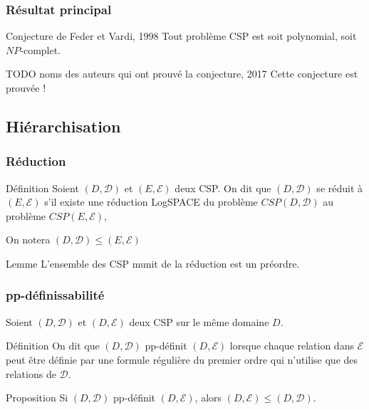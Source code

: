 \documentclass[12pt]{beamer}
\begin{document}
\begin{frame}
    \frametitle{Résultat principal}

    \begin{block}{Conjecture de Feder et Vardi, 1998}
        Tout problème CSP est soit polynomial, soit $NP$-complet.
    \end{block}
    \pause
    \begin{alertblock}{TODO noms des auteurs qui ont prouvé la conjecture, 2017}
        Cette conjecture est prouvée !
    \end{alertblock}
\end{frame}

\subsection{Hiérarchisation}

\begin{frame}
    \frametitle{Réduction}

    \begin{block}{Définition}
        Soient $(D,\mathcal{D})$ et $(E,\mathcal{E})$ deux CSP. On dit que
        $(D,\mathcal{D})$ se réduit à  $(E,\mathcal{E})$ s'il existe une réduction
        LogSPACE du problème $CSP(D,\mathcal{D})$ au problème $CSP(E,\mathcal{E})$,

        On notera $(D,\mathcal{D}) \leq (E,\mathcal{E})$
    \end{block}
    \pause
    \begin{exampleblock}{Lemme}
        L'ensemble des CSP munit de la réduction est un préordre.
    \end{exampleblock}
\end{frame}

\begin{frame}
    \frametitle{pp-définissabilité}

    Soient $(D,\mathcal{D})$ et $(D,\mathcal{E})$ deux CSP sur le même domaine $D$.

    \begin{block}{Définition}
        On dit que $(D,\mathcal{D})$ pp-définit
        $(D,\mathcal{E})$ lorsque chaque relation dans $\mathcal{E}$ peut être
        définie par une formule régulière du premier ordre qui n'utilise que
        des relations de $\mathcal{D}$.
    \end{block}
    \pause
    \begin{exampleblock}{Proposition}
        Si $(D,\mathcal{D})$ pp-définit $(D,\mathcal{E})$,
        alors $(D,\mathcal{E}) \leq (D,\mathcal{D})$.
    \end{exampleblock}
\end{frame}
\end{document}
